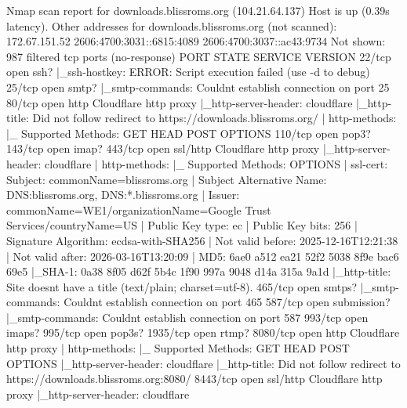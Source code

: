 \documentclass[
]{article}
\newenvironment{Shaded}{}{}
\newcommand{\NormalTok}[1]{#1}
\begin{document}
\begin{Shaded}
\begin{Highlighting}[]
\NormalTok{Nmap scan report for downloads.blissroms.org (104.21.64.137)}
\NormalTok{Host is up (0.39s latency).}
\NormalTok{Other addresses for downloads.blissroms.org (not scanned): 172.67.151.52 2606:4700:3031::6815:4089 2606:4700:3037::ac43:9734}
\NormalTok{Not shown: 987 filtered tcp ports (no{-}response)}
\NormalTok{PORT     STATE SERVICE     VERSION}
\NormalTok{22/tcp   open  ssh?}
\NormalTok{|\_ssh{-}hostkey: ERROR: Script execution failed (use {-}d to debug)}
\NormalTok{25/tcp   open  smtp?}
\NormalTok{|\_smtp{-}commands: Couldn\textquotesingle{}t establish connection on port 25}
\NormalTok{80/tcp   open  http        Cloudflare http proxy}
\NormalTok{|\_http{-}server{-}header: cloudflare}
\NormalTok{|\_http{-}title: Did not follow redirect to https://downloads.blissroms.org/}
\NormalTok{| http{-}methods:}
\NormalTok{|\_  Supported Methods: GET HEAD POST OPTIONS}
\NormalTok{110/tcp  open  pop3?}
\NormalTok{143/tcp  open  imap?}
\NormalTok{443/tcp  open  ssl/http    Cloudflare http proxy}
\NormalTok{|\_http{-}server{-}header: cloudflare}
\NormalTok{| http{-}methods:}
\NormalTok{|\_  Supported Methods: OPTIONS}
\NormalTok{| ssl{-}cert: Subject: commonName=blissroms.org}
\NormalTok{| Subject Alternative Name: DNS:blissroms.org, DNS:*.blissroms.org}
\NormalTok{| Issuer: commonName=WE1/organizationName=Google Trust Services/countryName=US}
\NormalTok{| Public Key type: ec}
\NormalTok{| Public Key bits: 256}
\NormalTok{| Signature Algorithm: ecdsa{-}with{-}SHA256}
\NormalTok{| Not valid before: 2025{-}12{-}16T12:21:38}
\NormalTok{| Not valid after:  2026{-}03{-}16T13:20:09}
\NormalTok{| MD5:   6ae0 a512 ea21 52f2 5038 8f9e bac6 69e5}
\NormalTok{|\_SHA{-}1: 0a38 8f05 d62f 5b4c 1f90 997a 9048 d14a 315a 9a1d}
\NormalTok{|\_http{-}title: Site doesn\textquotesingle{}t have a title (text/plain; charset=utf{-}8).}
\NormalTok{465/tcp  open  smtps?}
\NormalTok{|\_smtp{-}commands: Couldn\textquotesingle{}t establish connection on port 465}
\NormalTok{587/tcp  open  submission?}
\NormalTok{|\_smtp{-}commands: Couldn\textquotesingle{}t establish connection on port 587}
\NormalTok{993/tcp  open  imaps?}
\NormalTok{995/tcp  open  pop3s?}
\NormalTok{1935/tcp open  rtmp?}
\NormalTok{8080/tcp open  http        Cloudflare http proxy}
\NormalTok{| http{-}methods:}
\NormalTok{|\_  Supported Methods: GET HEAD POST OPTIONS}
\NormalTok{|\_http{-}server{-}header: cloudflare}
\NormalTok{|\_http{-}title: Did not follow redirect to https://downloads.blissroms.org:8080/}
\NormalTok{8443/tcp open  ssl/http    Cloudflare http proxy}
\NormalTok{|\_http{-}server{-}header: cloudflare}

\end{Highlighting}
\end{Shaded}
\end{document}
